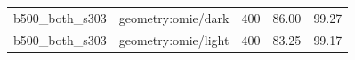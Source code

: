 \begin{longtable}{l>{\raggedright\arraybackslash}p{.42\linewidth}rrr}
b500\_\allowbreak{}both\_\allowbreak{}s303 & %
geometry:omie/dark & %
400 & %
86.00 & %
99.27 \\ %

b500\_\allowbreak{}both\_\allowbreak{}s303 & %
geometry:omie/light & %
400 & %
83.25 & %
99.17 \\ %


\end{longtable}
